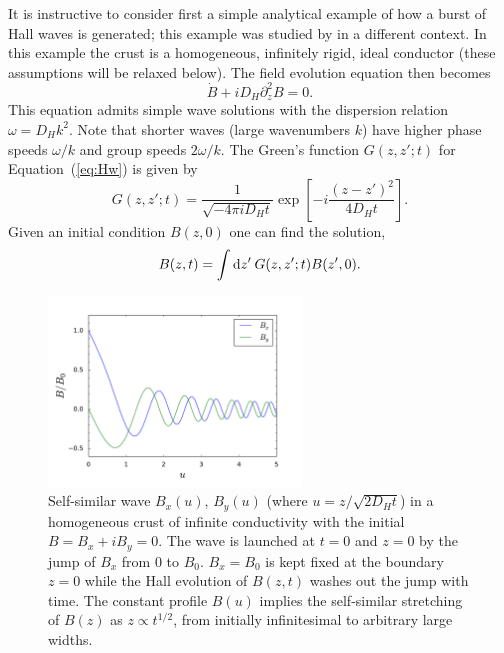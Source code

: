 It is instructive to consider first a simple analytical example of how a burst of Hall waves is 
generated; this example was studied by \citet{2015MNRAS.447.1407L} in a different context. 
In this example the crust is a homogeneous, infinitely rigid, ideal conductor 
(these assumptions will be relaxed below). The field evolution equation then becomes
\begin{equation}
\label{eq:Hw}
\dot{B} +iD_H\partial_z^2 B=0.	
\end{equation}
This equation admits simple wave solutions with the dispersion 
relation $\omega=D_H k^2$. Note that shorter waves (large wavenumbers $k$) 
have higher phase speeds $\omega/k$ and group speeds $2\omega/k$.
The Green's function $G(z,z';t)$ for Equation~(\ref{eq:Hw}) is given by
\begin{equation}
G(z,z';t) = 
\frac{1}{\sqrt{-4\pi i D_H t}}\exp\left[-i\frac{(z-z')^2}{4 D_H t}\right].	
\end{equation}
Given an initial condition $B(z,0)$ one can find the solution,
\begin{equation}
	B(z,t) = \int\mathrm{d} z'\: G(z,z';t)B(z',0).
\end{equation}

\begin{figure}[h]
\centering
\includegraphics[width=0.6\textwidth]{pics/chap2/fresnel.pdf} 
\caption[Components of magnetic field in the self-similar solution of Hall waves]{
Self-similar wave $B_x(u)$, $B_y(u)$ (where $u = z/\sqrt{2D_H t}$) in a 
homogeneous crust of infinite conductivity with the initial $B=B_x+iB_y=0$. 
The wave is launched at $t=0$ and $z=0$ by the 
jump of $B_x$ from 0 to $B_0$.
$B_x=B_0$ is kept fixed at the boundary $z=0$ while the Hall evolution of 
$B(z,t)$ washes out the jump with time. The constant profile $B(u)$
implies the self-similar stretching of $B(z)$ as $z\propto t^{1/2}$, from initially
infinitesimal to arbitrary large widths.
}
\label{fresnel1}
\end{figure}

